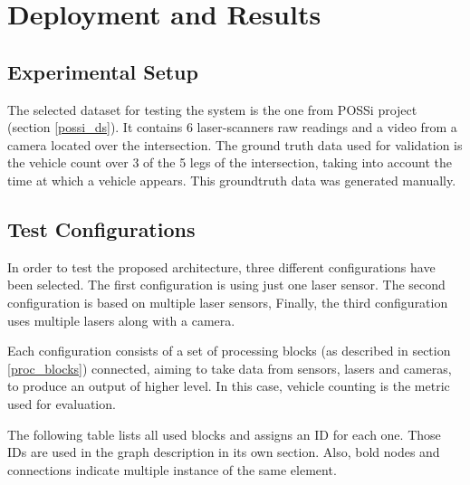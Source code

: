 \chapter [Deployment and Results]{Deployment and Results}

\section{Experimental Setup}

The selected dataset for testing the system is the one from POSSi project (section \ref{possi_ds}). It contains 6 laser-scanners raw readings and a video from a camera located over the intersection. The ground truth data used for validation is the vehicle count over 3 of the 5 legs of the intersection, taking into account the time at which a vehicle appears. This groundtruth data was generated manually.
 

\section{Test Configurations}
In order to test the proposed architecture, three different configurations have been selected. The first configuration is using just one laser sensor. The second configuration is based on multiple laser sensors, Finally, the third configuration uses multiple lasers along with a camera.

Each configuration consists of a set of processing blocks (as described in section \ref{proc_blocks}) connected, aiming to take data from sensors, lasers and cameras, to produce an output of higher level. In this case, vehicle counting is the metric used for evaluation.

The following table lists all used blocks and assigns an ID for each one. Those IDs are used in the graph description in its own section. Also, bold nodes and connections indicate multiple instance of the same element.


